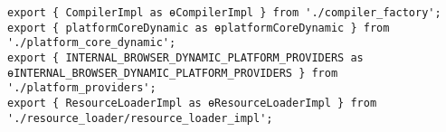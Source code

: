\begin{verbatim}
export { CompilerImpl as ɵCompilerImpl } from './compiler_factory';
export { platformCoreDynamic as ɵplatformCoreDynamic } from './platform_core_dynamic';
export { INTERNAL_BROWSER_DYNAMIC_PLATFORM_PROVIDERS as ɵINTERNAL_BROWSER_DYNAMIC_PLATFORM_PROVIDERS } from './platform_providers';
export { ResourceLoaderImpl as ɵResourceLoaderImpl } from './resource_loader/resource_loader_impl';
\end{verbatim}
